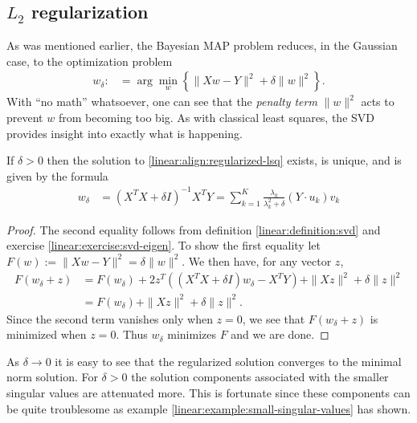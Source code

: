 \subsection{$L_2$ regularization}
As was mentioned earlier, the Bayesian MAP problem reduces, in the Gaussian case, to the optimization problem
\begin{align}
  w_\delta :&= \arg\min_w \left\{ \|Xw - Y\|^2 + \delta\|w\|^2 \right\}.
  \label{linear:align:regularized-lsq}
\end{align}
With ``no math'' whatsoever, one can see that the \emph{penalty term} $\|w\|^2$ acts to prevent $w$ from becoming too big.  As with classical least squares, the SVD provides insight into exactly what is happening.

\begin{theorem}
  If $\delta>0$ then the solution to \eqref{linear:align:regularized-lsq} exists, is unique, and is given by the formula
  \begin{align*}
    w_\delta &= (X^TX + \delta I)^{-1} X^TY = \sum_{k=1}^K \frac{\lambda_k}{\lambda_k^2 + \delta}(Y\cdot u_k)v_k
  \end{align*}
  \label{linear:theorem:regularized-lsq}
\end{theorem}
\begin{proof}
  The second equality follows from definition \ref{linear:definition:svd} and exercise \ref{linear:exercise:svd-eigen}.  To show the first equality let $F(w):= \|X w-Y\|^2 = \delta\|w\|^2$.  We then have, for any vector $z$,
  \begin{align*}
    F(w_\delta+z) &= F(w_\delta) + 2z^T\left( (X^TX + \delta I)w_\delta - X^TY \right) + \|X z\|^2 + \delta\|z\|^2 \\
    &= F(w_\delta) + \|X z\|^2 + \delta\|z\|^2.
  \end{align*}
  Since the second term vanishes only when $z=0$, we see that $F(w_\delta+z)$ is minimized when $z=0$.  Thus $w_\delta$ minimizes $F$ and we are done.
\end{proof}

\begin{remark}
  As $\delta\to0$ it is easy to see that the regularized solution converges to the minimal norm solution.  For $\delta>0$ the solution components associated with the smaller singular values are attenuated more.  This is fortunate since these components can be quite troublesome as example \ref{linear:example:small-singular-values} has shown.  
\end{remark}

